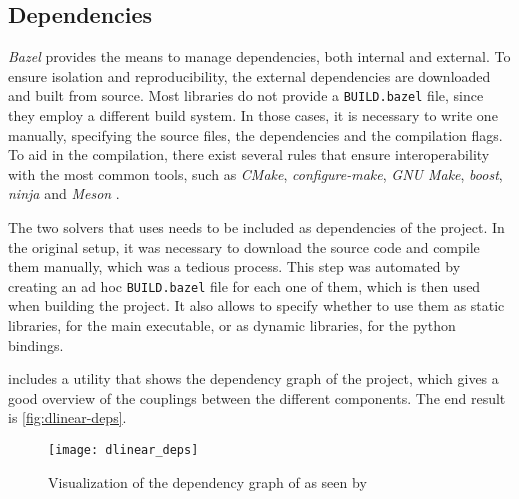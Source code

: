

\subsection*{Dependencies}

\textit{Bazel} provides the means to manage dependencies, both internal and external.
To ensure isolation and reproducibility, the external dependencies are downloaded and built from source.
Most libraries do not provide a \texttt{BUILD.bazel} file, since they employ a different build system.
In those cases, it is necessary to write one manually, specifying the source files, the dependencies and the compilation flags.
To aid in the compilation, there exist several rules that ensure interoperability with the most common tools, such as \textit{CMake}, \textit{configure-make}, \textit{GNU Make}, \textit{boost}, \textit{ninja} and \textit{Meson} \cite{repo:rules-foreign-cc}.



The two solvers that \dlinear uses needs to be included as dependencies of the project.
In the original setup, it was necessary to download the source code and compile them manually, which was a tedious process.
This step was automated by creating an ad hoc \texttt{BUILD.bazel} file for each one of them, which is then used when building the project.
It also allows to specify whether to use them as static libraries, for the main executable, or as dynamic libraries, for the python bindings.



\bazel includes a utility that shows the dependency graph of the project, which gives a good overview of the couplings between the different components.
The end result is \autoref{fig:dlinear-deps}.

\begin{figure}[h]
    \centering
    \texttt{[image: dlinear\_deps]}
    \caption{Visualization of the dependency graph of \dlinear as seen by \bazel}\label{fig:dlinear-deps}
\end{figure}
